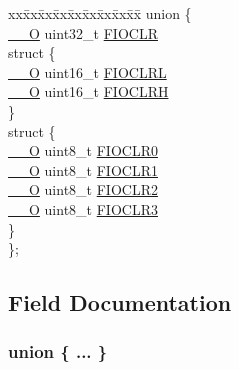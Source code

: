 \begin{DoxyCompactItemize}
\begin{tabbing}
\end{tabbing}\item 
\begin{tabbing}
xx\=xx\=xx\=xx\=xx\=xx\=xx\=xx\=xx\=\kill
union \{\\
\>\hyperlink{LPC17xx_8h_a7e25d9380f9ef903923964322e71f2f6}{\_\_O} uint32\_t \hyperlink{structLPC__GPIO__TypeDef_adaa1ee82b7dfb7cbeaa41ca11cbb4a25}{FIOCLR}\\
\>struct \{\\
\>\>\hyperlink{LPC17xx_8h_a7e25d9380f9ef903923964322e71f2f6}{\_\_O} uint16\_t \hyperlink{structLPC__GPIO__TypeDef_ae388daafe7a53bb40e3b46cc353f783e}{FIOCLRL}\\
\>\>\hyperlink{LPC17xx_8h_a7e25d9380f9ef903923964322e71f2f6}{\_\_O} uint16\_t \hyperlink{structLPC__GPIO__TypeDef_af752c5016e4ea45235affc90afef6d6c}{FIOCLRH}\\
\>\} \\
\>struct \{\\
\>\>\hyperlink{LPC17xx_8h_a7e25d9380f9ef903923964322e71f2f6}{\_\_O} uint8\_t \hyperlink{structLPC__GPIO__TypeDef_a9b0742e970731100d80bb2f88fed2ea8}{FIOCLR0}\\
\>\>\hyperlink{LPC17xx_8h_a7e25d9380f9ef903923964322e71f2f6}{\_\_O} uint8\_t \hyperlink{structLPC__GPIO__TypeDef_a9b763588875f6dc2177cc2a643cf59b6}{FIOCLR1}\\
\>\>\hyperlink{LPC17xx_8h_a7e25d9380f9ef903923964322e71f2f6}{\_\_O} uint8\_t \hyperlink{structLPC__GPIO__TypeDef_adb1fc9ab3b2fbf405249d6256285abe5}{FIOCLR2}\\
\>\>\hyperlink{LPC17xx_8h_a7e25d9380f9ef903923964322e71f2f6}{\_\_O} uint8\_t \hyperlink{structLPC__GPIO__TypeDef_aeaa956f5de4442c0436497c419204f35}{FIOCLR3}\\
\>\} \\
\}; \\

\end{tabbing}\end{DoxyCompactItemize}


\subsection{Field Documentation}
\subsubsection[{\texorpdfstring{"@10}{@10}}]{\setlength{\rightskip}{0pt plus 5cm}union \{ ... \} }\hypertarget{structLPC__GPIO__TypeDef_ab9bcb364342f6982bc48aa91f0438941}{}\label{structLPC__GPIO__TypeDef_ab9bcb364342f6982bc48aa91f0438941}
